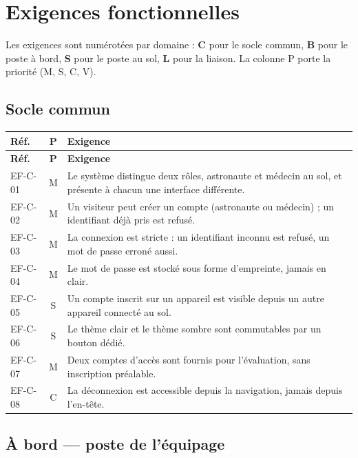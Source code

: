 \documentclass[11pt,a4paper]{article}
\let\sectionorig\section
\renewcommand{\section}{\Needspace{5\baselineskip}\sectionorig}
\begin{document}
\section{Exigences fonctionnelles}

Les exigences sont num\'erot\'ees par domaine : \textbf{C} pour le socle commun, \textbf{B} pour le
poste \`a bord, \textbf{S} pour le poste au sol, \textbf{L} pour la liaison. La colonne \og P \fg{}
porte la priorit\'e (M, S, C, V).

\subsection{Socle commun}

\begin{longtable}{@{}L{1.9cm} c L{12.1cm}@{}}
\toprule
\textbf{R\'ef.} & \textbf{P} & \textbf{Exigence} \\
\midrule
\endfirsthead
\toprule
\textbf{R\'ef.} & \textbf{P} & \textbf{Exigence} \\
\midrule
\endhead
\bottomrule
\endfoot
EF-C-01 & M & Le syst\`eme distingue deux r\^oles, astronaute et m\'edecin au sol, et pr\'esente \`a chacun une interface diff\'erente. \\
EF-C-02 & M & Un visiteur peut cr\'eer un compte (astronaute ou m\'edecin) ; un identifiant d\'ej\`a pris est refus\'e. \\
EF-C-03 & M & La connexion est stricte : un identifiant inconnu est refus\'e, un mot de passe erron\'e aussi. \\
EF-C-04 & M & Le mot de passe est stock\'e sous forme d'empreinte, jamais en clair. \\
EF-C-05 & S & Un compte inscrit sur un appareil est visible depuis un autre appareil connect\'e au sol. \\
EF-C-06 & S & Le th\`eme clair et le th\`eme sombre sont commutables par un bouton d\'edi\'e. \\
EF-C-07 & M & Deux comptes d'acc\`es sont fournis pour l'\'evaluation, sans inscription pr\'ealable. \\
EF-C-08 & C & La d\'econnexion est accessible depuis la navigation, jamais depuis l'en-t\^ete. \\
\end{longtable}

\subsection{\`A bord --- poste de l'\'equipage}
\end{document}
